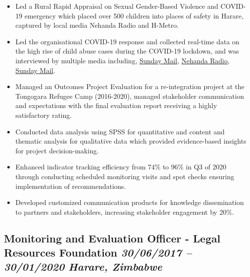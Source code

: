 \documentclass[
  10pt,
]{article}
\providecommand{\tightlist}{%
  \setlength{\itemsep}{0pt}\setlength{\parskip}{0pt}}
\begin{document}
\begin{itemize}
\tightlist
\item
  Led a Rural Rapid Appraisal on Sexual Gender-Based Violence and
  COVID-19 emergency which placed over 500 children into places of
  safety in Harare, captured by local media Nehanda Radio and H-Metro.
\item
  Led the organisational COVID-19 response and collected real-time data
  on the high rise of child abuse cases during the COVID-19 lockdown,
  and was interviewed by multiple media including,
  \href{https://www.sundaymail.co.zw/is-your-child-safe-shocking-rise-in-child-abuse-cases}{Sunday
  Mail},
  \href{https://nehandaradio.com/2020/04/17/62-children-removed-from-the-streets/}{Nehanda
  Radio},
  \href{https://www.sundaymail.co.zw/school-misdemeanours-tip-of-the-iceberg}{Sunday
  Mail}.
\item
  Managed an Outcomes Project Evaluation for a re-integration project at
  the Tongogara Refugee Camp (2016-2020), managed stakeholder
  communication and expectations with the final evaluation report
  receiving a highly satisfactory rating.
\item
  Conducted data analysis using SPSS for quantitative and content and
  thematic analysis for qualitative data which provided evidence-based
  insights for project decision-making.
\item
  Enhanced indicator tracking efficiency from 74\% to 96\% in Q3 of 2020
  through conducting scheduled monitoring visits and spot checks
  ensuring implementation of recommendations.
\item
  Developed customized communication products for knowledge
  dissemination to partners and stakeholders, increasing stakeholder
  engagement by 20\%.
\end{itemize}

\subsection{\texorpdfstring{Monitoring and Evaluation Officer - Legal
Resources Foundation \emph{30/06/2017 -- 30/01/2020} \textbar{}
\emph{Harare,
Zimbabwe}}{Monitoring and Evaluation Officer - Legal Resources Foundation 30/06/2017 -- 30/01/2020 \textbar{} Harare, Zimbabwe}}\label{monitoring-and-evaluation-officer---legal-resources-foundation-30062017-30012020-harare-zimbabwe}
\end{document}
